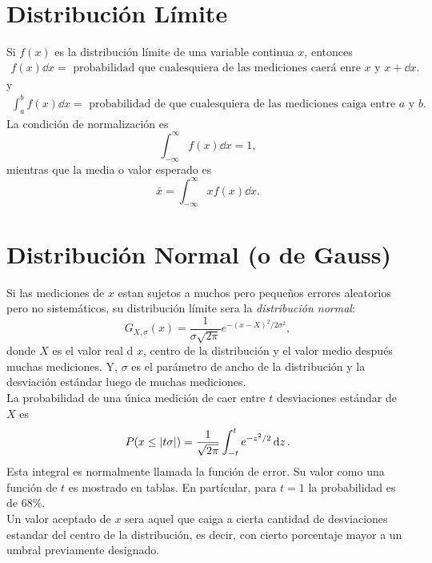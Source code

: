 \section{Distribución Límite}
		Si $f(x)$ es la distribución límite de una variable continua $x$, entonces
			\begin{align*}
				f(x) \dd{x} = \text{ probabilidad que cualesquiera de las mediciones caerá enre } x \text{ y } x+\dd{x}.
			\end{align*}
		y
			\begin{align*}
				\int _a ^b f(x) \dd{x} = \text{ probabilidad de que cualesquiera de las mediciones caiga entre } a \text{ y } b.
			\end{align*}
		La condición de normalización es
			\begin{equation}
				\int _{-\infty} ^\infty f(x) \dd{x} = 1,
			\end{equation}
		mientras que la media o valor esperado es
			\begin{equation}
				\bar{x} = \int _{-\infty} ^\infty xf(x) \dd{x}.
			\end{equation}
\section{Distribución Normal (o de Gauss)}
Si las mediciones de $x$ estan sujetos a muchos pero pequeños errores aleatorios pero no sistemáticos, su distribución límite sera la \textit{distribución normal}:
	\begin{equation}
		G_{X,\sigma} (x) = \frac{1}{\sigma \sqrt{2\pi}} e^{-(x - X)^2 /2\sigma ^2}, 
	\end{equation}
donde $X$ es el valor real d $x$, centro de la distribución y el valor medio después muchas mediciones. Y, $\sigma$ es el parámetro de ancho de la distribución y la desviación estándar luego de muchas mediciones. \\

La probabilidad de una única medición de caer entre $t$ desviaciones estándar de $X$ es
	\begin{equation}
		P(x \leq \abs{t\sigma}) = \frac{1}{\sqrt{2\pi}} \int _{-t} ^t e^{-z^2 /2} \dd{z}.
	\end{equation}
Esta integral es normalmente llamada la función de error. Su valor como una función de $t$ es mostrado en tablas. En partícular, para $t = 1$ la probabilidad es de $68\%$.  \\

Un valor aceptado de $x$ sera aquel que caiga a cierta cantidad de desviaciones estandar del centro de la distribución, es decir, con cierto porcentaje mayor a un umbral previamente designado.



